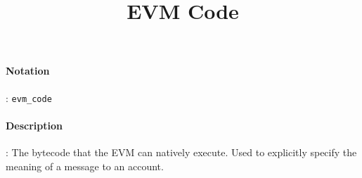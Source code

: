 \documentclass[10pt,a4paper,oneside]{scrartcl}
\author{}
\title{EVM Code}
\date{}
\begin{document}
\maketitle
\paragraph{Notation}: \texttt{evm\_code}
\paragraph{Description}: The bytecode that the EVM can natively execute. Used to explicitly specify the meaning of a message to an account.
\end{document}
